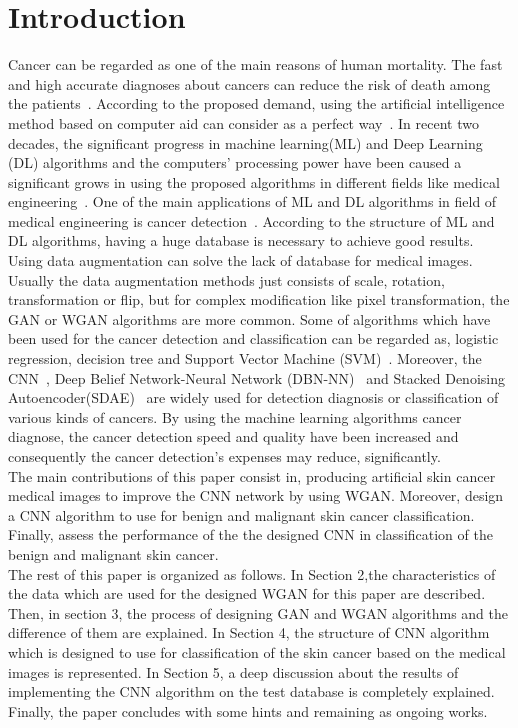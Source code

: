 \documentclass[conference]{IEEEtran}
\begin{document}
\section{Introduction}

Cancer can be regarded as one of the main reasons of human mortality. The fast and high accurate diagnoses about cancers can reduce the risk of death among the patients~\cite{3}. According to the proposed demand, using the artificial intelligence method based on computer aid can consider as a perfect way~\cite{4}. 
In recent two decades, the significant progress in machine learning(ML) and Deep Learning (DL) algorithms and the computers' processing power have been caused a significant grows in using the proposed algorithms in different fields like medical engineering~\cite{5,6,7}. One of the main applications of ML and DL algorithms in field of medical engineering is cancer detection~\cite{8,9,10}.  According to the structure of ML and DL algorithms, having a huge database is necessary to achieve good results. Using data augmentation can solve the lack of database for medical images. Usually the data augmentation methods just consists of scale, rotation, transformation or flip, but for complex modification like pixel transformation, the GAN or WGAN algorithms are more common.
Some of algorithms which have been used for the cancer detection and classification can be regarded as, logistic regression, decision tree and Support Vector Machine (SVM)~\cite{13}. Moreover, the CNN~\cite{14,15,16}, Deep Belief Network-Neural Network (DBN-NN)~\cite{17} and Stacked Denoising Autoencoder(SDAE)~\cite{18} are widely used for detection\/ diagnosis or classification of various kinds of cancers.  By using the machine learning algorithms cancer diagnose, the cancer detection speed and quality have been increased and consequently the cancer detection's expenses may reduce, significantly.\\
The main contributions of this paper consist in, producing artificial skin cancer medical images to improve the CNN network by using WGAN. Moreover, design a CNN algorithm to use for benign and malignant skin cancer classification. Finally, assess the performance of the the designed CNN in classification of the benign and malignant skin cancer.\\
The rest of this paper is organized as follows. In Section 2,the characteristics of the data which are used for the designed WGAN for this paper are described. Then, in section 3, the process of designing GAN and WGAN algorithms and the difference of them are explained. In Section 4, the structure of CNN algorithm which is designed to use for classification of the skin cancer based on the medical images is represented. In Section 5, a deep discussion about the results of implementing the CNN algorithm on the test database is completely explained. Finally, the paper concludes with some hints and remaining as ongoing works.
\end{document}
